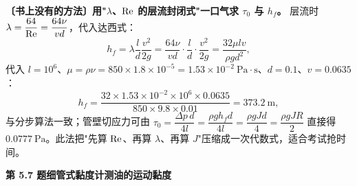 \begin{banfa}
\textbf{〔书上没有的方法〕用"$\lambda$、$\mathrm{Re}$ 的层流封闭式"一口气求 $\tau_0$ 与 $h_f$。} 层流时 $\lambda=\dfrac{64}{\mathrm{Re}}=\dfrac{64\nu}{vd}$，代入达西式：
\[h_f=\lambda\frac{l}{d}\frac{v^2}{2g}=\frac{64\nu}{vd}\cdot\frac{l}{d}\cdot\frac{v^2}{2g}=\frac{32\mu lv}{\rho gd^2},\]
代入 $l=10^6$、$\mu=\rho\nu=850\times1.8\times10^{-5}=1.53\times10^{-2}\ \mathrm{Pa\cdot s}$、$d=0.1$、$v=0.0635$：
\[h_f=\frac{32\times1.53\times10^{-2}\times10^6\times0.0635}{850\times9.8\times0.01}=373.2\ \mathrm{m},\]
与分步算法一致；管壁切应力可由 $\tau_0=\dfrac{\Delta p\,d}{4l}=\dfrac{\rho g h_f d}{4l}=\dfrac{\rho g Jd}{4}=\dfrac{\rho gJR}{2}$ 直接得 $0.0777\ \mathrm{Pa}$。此法把"先算 $\mathrm{Re}$、再算 $\lambda$、再算 $J$"压缩成一次代数式，适合考试抢时间。
\end{banfa}

\noindent\textbf{第 5.7 题\quad 细管式黏度计测油的运动黏度}

